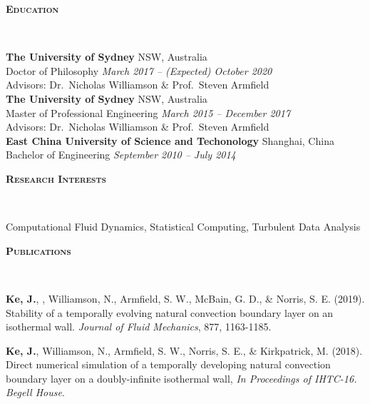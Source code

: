 \documentclass[letterpaper, 10pt]{article}
\newenvironment{changemargin}[2]{%
  \begin{list}{}{%
      \setlength{\topsep}{0pt}%
      \setlength{\leftmargin}{#1}%
      \setlength{\rightmargin}{#2}%
      \setlength{\listparindent}{\parindent}%
      \setlength{\itemindent}{\parindent}%
      \setlength{\parsep}{\parskip}%
    }%
  \item[]}{\end{list}
}
\newcommand{\lineover}{
  \begin{changemargin}{-0.05in}{-0.05in}
    \vspace*{-8pt}
    \hrulefill \\
    \vspace*{-2pt}
  \end{changemargin}
}
\newcommand{\header}[1]{
  \begin{changemargin}{-0.5in}{-0.5in}
    \textbf{\scshape{#1}}\\
    \lineover
  \end{changemargin}
}
\newenvironment{body} {
  \vspace*{-16pt}
  \begin{changemargin}{-0.25in}{-0.5in}
  }
  {\end{changemargin}
}
\begin{document}
\header{Education}
\begin{body}
  \vspace{14pt}
  \textbf{The University of Sydney} \hfill{NSW, Australia}\\
  \smallskip
  Doctor of Philosophy \hfill \emph{March 2017 -- (Expected) October 2020}\\
  Advisors: Dr.\ Nicholas Williamson \& Prof.\ Steven Armfield \\
  \smallskip
  \textbf{The University of Sydney} \hfill{NSW, Australia}\\
  \smallskip
  Master of Professional Engineering \hfill \emph{March 2015 -- December 2017}\\
  Advisors: Dr.\ Nicholas Williamson \& Prof.\ Steven Armfield \\
  \smallskip
  \textbf{East China University of Science and Techonology} \hfill{Shanghai, China}\\
  \smallskip
  Bachelor of Engineering \hfill
  \emph{September 2010 -- July 2014} \\
\end{body}
\smallskip



\header{Research Interests}
Computational Fluid Dynamics, Statistical Computing, Turbulent Data Analysis
\smallskip



\header{Publications}
\begin{body}
  \vspace{14pt}

  \textbf{Ke, J.}, , Williamson, N., Armfield, S. W., McBain, G. D., \& Norris, S. E. (2019). Stability of a temporally evolving natural convection boundary layer on an isothermal wall. \emph{Journal of Fluid Mechanics}, 877, 1163-1185.

  \smallskip

  \textbf{Ke, J.}, Williamson, N., Armfield, S. W., Norris, S. E., \& Kirkpatrick, M. (2018). Direct numerical simulation of a temporally developing natural convection boundary layer on a doubly-infinite isothermal wall, \emph{In Proceedings of IHTC-16. Begell House}. %
  

\end{body}
\smallskip
\end{document}
